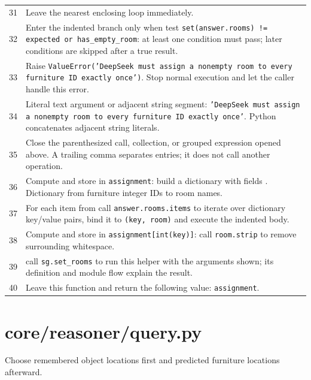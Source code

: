 \documentclass[11pt,a4paper]{book}
\begin{document}
\begin{longtable}{r p{}}
31 & Leave the nearest enclosing loop immediately. \\

32 & Enter the indented branch only when test \texttt{set(answer.rooms) != expected or has\_empty\_room}: at least one condition must pass; later conditions are skipped after a true result. \\

33 & Raise \texttt{ValueError('DeepSeek must assign a nonempty room to every furniture ID exactly once')}. Stop normal execution and let the caller handle this error. \\

34 & Literal text argument or adjacent string segment: \texttt{'DeepSeek must assign a nonempty room to every furniture ID exactly once'}. Python concatenates adjacent string literals. \\

35 & Close the parenthesized call, collection, or grouped expression opened above. A trailing comma separates entries; it does not call another operation. \\

36 & Compute and store in \texttt{assignment}: build a dictionary with fields \texttt{}. Dictionary from furniture integer IDs to room names. \\

37 & For each item from call \texttt{answer.rooms.items} to iterate over dictionary key/value pairs, bind it to \texttt{(key, room)} and execute the indented body. \\

38 & Compute and store in \texttt{assignment[int(key)]}: call \texttt{room.strip} to remove surrounding whitespace.  \\

39 & call \texttt{sg.set\_rooms} to run this helper with the arguments shown; its definition and module flow explain the result. \\

40 & Leave this function and return the following value: \texttt{assignment}. \\

\end{longtable}

\chapter{core/reasoner/query.py}

Choose remembered object locations first and predicted furniture locations afterward.
\end{document}
